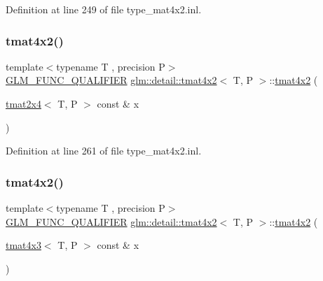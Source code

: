 Definition at line 249 of file type\+\_\+mat4x2.\+inl.

\mbox{\label{structglm_1_1detail_1_1tmat4x2_abfac9500ea47ed389da5d877b7b7d716}} 
\subsubsection{\texorpdfstring{tmat4x2()}{tmat4x2()}\hspace{0.1cm}{\footnotesize\ttfamily [16/22]}}
{\footnotesize\ttfamily template$<$typename T , precision P$>$ \\
\hyperlink{setup_8hpp_a33fdea6f91c5f834105f7415e2a64407}{G\+L\+M\+\_\+\+F\+U\+N\+C\+\_\+\+Q\+U\+A\+L\+I\+F\+I\+ER} \hyperlink{structglm_1_1detail_1_1tmat4x2}{glm\+::detail\+::tmat4x2}$<$ T, P $>$\+::\hyperlink{structglm_1_1detail_1_1tmat4x2}{tmat4x2} (\begin{DoxyParamCaption}\item[{\hyperlink{structglm_1_1detail_1_1tmat2x4}{tmat2x4}$<$ T, P $>$ const \&}]{x }\end{DoxyParamCaption})\hspace{0.3cm}{\ttfamily [explicit]}}



Definition at line 261 of file type\+\_\+mat4x2.\+inl.

\mbox{\label{structglm_1_1detail_1_1tmat4x2_a0f0e6e3e2d0a7bc9d9979a132c410298}} 
\subsubsection{\texorpdfstring{tmat4x2()}{tmat4x2()}\hspace{0.1cm}{\footnotesize\ttfamily [17/22]}}
{\footnotesize\ttfamily template$<$typename T , precision P$>$ \\
\hyperlink{setup_8hpp_a33fdea6f91c5f834105f7415e2a64407}{G\+L\+M\+\_\+\+F\+U\+N\+C\+\_\+\+Q\+U\+A\+L\+I\+F\+I\+ER} \hyperlink{structglm_1_1detail_1_1tmat4x2}{glm\+::detail\+::tmat4x2}$<$ T, P $>$\+::\hyperlink{structglm_1_1detail_1_1tmat4x2}{tmat4x2} (\begin{DoxyParamCaption}\item[{\hyperlink{structglm_1_1detail_1_1tmat4x3}{tmat4x3}$<$ T, P $>$ const \&}]{x }\end{DoxyParamCaption})\hspace{0.3cm}{\ttfamily [explicit]}}



